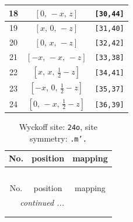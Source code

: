 \documentclass[fleqn,8pt]{jsarticle}
\begin{document}
\begin{longtable}{ccc}
18 & $\left[ 0,\, - x,\, z \right]$ & {\tt [30,44]} \\ \hline
19 & $\left[ x,\, 0,\, - z \right]$ & {\tt [31,40]} \\ \hline
20 & $\left[ 0,\, x,\, - z \right]$ & {\tt [32,42]} \\ \hline
21 & $\left[ - x,\, - x,\, - z \right]$ & {\tt [33,38]} \\ \hline
22 & $\left[ x,\, x,\, \frac{1}{2} - z \right]$ & {\tt [34,41]} \\ \hline
23 & $\left[ - x,\, 0,\, \frac{1}{2} - z \right]$ & {\tt [35,37]} \\ \hline
24 & $\left[ 0,\, - x,\, \frac{1}{2} - z \right]$ & {\tt [36,39]} \\
\end{longtable}
\renewcommand{\arraystretch}{1.2}
\begin{longtable}{ccc}
\caption{Wyckoff site: {\tt 24o}, site symmetry: {\tt .m'.}}
 \\
 \hline \hline
No. & position & mapping \\ \hline \endfirsthead

\multicolumn{2}{l}{\tablename\ \thetable{}} \\
 \hline \hline
No. & position & mapping \\ \hline \endhead

 \hline \hline
\multicolumn{2}{r}{\footnotesize\it continued ...} \\ \endfoot

 \hline \hline
\multicolumn{2}{r}{} \\ \endlastfoot


\end{longtable}
\end{document}
